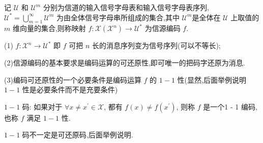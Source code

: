 \begin{definition}
    记 $ \mathscr{U} $ 和 $ \mathscr{U}^{m} $ 分别为信道的输入信号字母表和输入信号字母表序列, $ \mathscr{U}^{*}=\bigcup\limits_{m=1}^{\infty} \mathscr{U}^{m} $ 为由全体信号字母串所组成的集合,其中 $ \mathscr{U}^{m} $是全体在 $ \mathscr{U} $ 上取值的 $ m $ 维向量的集合,则称映射 $ f: \mathscr{X}\left(\mathscr{X}^{n}\right) \rightarrow \mathscr{U}^{*} $ 为信源编码 $ f $.
\end{definition}
\begin{remark}

    (1) $ f: \mathscr{X}^{n} \rightarrow \mathscr{U}^{*} $ 即 $ f $ 可把 $ n $ 长的消息序列变为信号序列(可以不等长);
    
(2)信源编码的基本要求是编码运算的可还原性,即可唯一的把码字还原为消息.

(3)编码可还原性的一个必要条件是编码运算 $ f $ 的 $ 1-1 $ 性(显然,后面举例说明 $ 1-1 $ 性是必要条件而不是充要条件)

\end{remark}

\begin{definition}
$ 1-1 $ 码: 如果对于 $ \forall x \neq x^{\prime} \in \mathscr{X} $, 都有 $ f(x) \neq f\left(x^{\prime}\right) $, 则称 $ f $ 是一个1 - 1 编码,也称 $ f $ 满足 $ 1-1 $ 性.
\end{definition}
\begin{remark}
 $ 1-1 $ 码不一定是可还原码,后面举例说明.
\end{remark}

